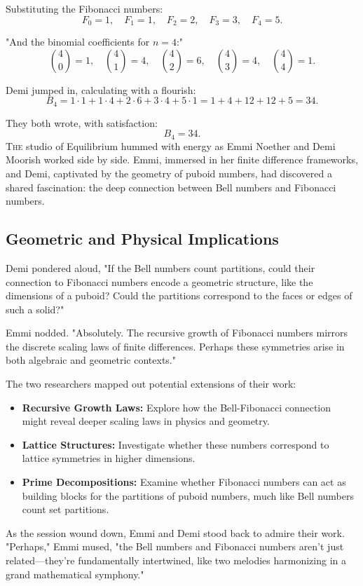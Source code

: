 Substituting the Fibonacci numbers:
\[
F_0 = 1, \quad F_1 = 1, \quad F_2 = 2, \quad F_3 = 3, \quad F_4 = 5.
\]

"And the binomial coefficients for \(n=4\):"
\[
\binom{4}{0} = 1, \quad \binom{4}{1} = 4, \quad \binom{4}{2} = 6, \quad \binom{4}{3} = 4, \quad \binom{4}{4} = 1.
\]

Demi jumped in, calculating with a flourish:
\[
B_4 = 1 \cdot 1 + 1 \cdot 4 + 2 \cdot 6 + 3 \cdot 4 + 5 \cdot 1 = 1 + 4 + 12 + 12 + 5 = 34.
\]

They both wrote, with satisfaction:
\[
B_4 = 34.
\]
\lettrine{T}{he} studio of Equilibrium hummed with energy as Emmi Noether and Demi Moorish worked side by side. Emmi, immersed in her finite difference frameworks, and Demi, captivated by the geometry of puboid numbers, had discovered a shared fascination: the deep connection between Bell numbers and Fibonacci numbers.

\subsection*{Geometric and Physical Implications}

Demi pondered aloud, "If the Bell numbers count partitions, could their connection to Fibonacci numbers encode a geometric structure, like the dimensions of a puboid? Could the partitions correspond to the faces or edges of such a solid?"

Emmi nodded. "Absolutely. The recursive growth of Fibonacci numbers mirrors the discrete scaling laws of finite differences. Perhaps these symmetries arise in both algebraic and geometric contexts."

The two researchers mapped out potential extensions of their work:
\begin{itemize}
    \item \textbf{Recursive Growth Laws:} Explore how the Bell-Fibonacci connection might reveal deeper scaling laws in physics and geometry.
    \item \textbf{Lattice Structures:} Investigate whether these numbers correspond to lattice symmetries in higher dimensions.
    \item \textbf{Prime Decompositions:} Examine whether Fibonacci numbers can act as building blocks for the partitions of puboid numbers, much like Bell numbers count set partitions.
\end{itemize}

As the session wound down, Emmi and Demi stood back to admire their work. "Perhaps," Emmi mused, "the Bell numbers and Fibonacci numbers aren’t just related—they’re fundamentally intertwined, like two melodies harmonizing in a grand mathematical symphony."

